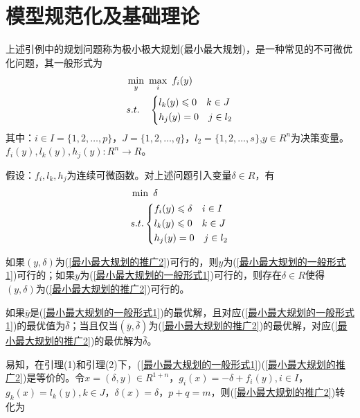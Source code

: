 \section{模型规范化及基础理论}
    \par
    上述引例中的规划问题称为极小极大规划(最小最大规划)，是一种常见的不可微优化问题，其一般形式为
    \begin{align}
    \label{最小最大规划的一般形式1}
    &\mathop{\min}\limits_{y}\ \mathop{\max}\limits_{i}\ f_i(y)\\
    &s.t.\quad \left\{
    \begin{aligned}
    &l_k(y)\leqslant 0\quad k\in J\notag \\
    &h_j(y)=0 \quad j\in l_2\notag
    \end{aligned}
    \right.
    \end{align}
    其中：$i\in I=\{1,2,\ldots,p\}$，$J=\{1,2,\ldots,q\}$，$l_2=\{1,2,\ldots,s\}$,$y\in R^n$为决策变量。$f_i(y),l_k(y),h_j(y):R^n \to R$。
    \par
    假设：$f_i,l_k,h_j$为连续可微函数。对上述问题引入变量$\delta \in R$，有
    \begin{align}
    \label{最小最大规划的推广2}
    &\mathop{\min}\  \delta\\
    &s.t. \left\{
    \begin{aligned}
    &f_i(y)\leqslant \delta \quad i\in I\notag \\
    &l_k(y)\leqslant 0\quad k\in J\notag \\
    &h_j(y)=0 \quad j\in l_2\notag
    \end{aligned}
    \right.
    \end{align}
    \begin{lemma}[1]\label{lemma1}
    如果$(y,\delta)$为(\ref{最小最大规划的推广2})可行的，则$y$为(\ref{最小最大规划的一般形式1})可行的；如果$y$为(\ref{最小最大规划的一般形式1})可行的，则存在$\delta \in R$使得$(y,\delta)$为(\ref{最小最大规划的推广2})可行的。
    \end{lemma}
    \begin{lemma}[2]\label{lemma2}
    如果$\bar{y}$是(\ref{最小最大规划的一般形式1})的最优解，且对应(\ref{最小最大规划的一般形式1})的最优值为$\bar{\delta}$；当且仅当$(\bar{y},\bar{\delta})$为(\ref{最小最大规划的推广2})的最优解，对应(\ref{最小最大规划的推广2})的最优解为$\bar{\delta}$。
    \end{lemma}
    \par
    易知，在引理(1)和引理(2)下，(\ref{最小最大规划的一般形式1})(\ref{最小最大规划的推广2})是等价的。令$x=(\delta , y)\in R^{1+n}$，$g_i(x)=-\delta+f_i(y),i\in I$，$g_k(x)=l_k(y),k \in J$，$\delta(x)=\delta$，$p+q=m$，则(\ref{最小最大规划的推广2})转化为
